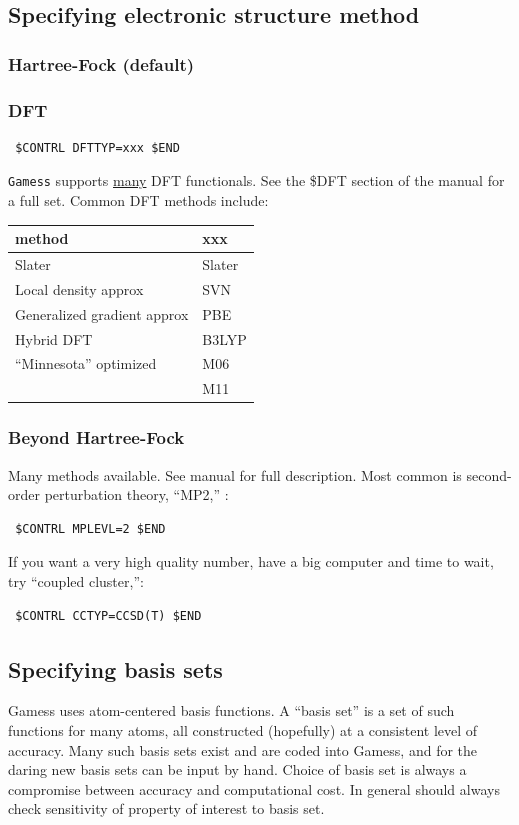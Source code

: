 \documentclass[11pt]{article}
\begin{document}
\subsection{Specifying electronic structure method}
\label{sec:org50de60d}
\subsubsection{Hartree-Fock (default)}
\label{sec:org33e8382}
\subsubsection{DFT}
\label{sec:org130944c}
\begin{verbatim}
 $CONTRL DFTTYP=xxx $END
\end{verbatim}
\texttt{Gamess} supports \uline{many} DFT functionals.  See the \$DFT section of the manual for a full set.  Common DFT methods include:
\begin{center}
\begin{tabular}{ll}
\hline
method & xxx\\
\hline
Slater & Slater\\
Local density approx & SVN\\
Generalized gradient approx & PBE\\
Hybrid DFT & B3LYP\\
``Minnesota'' optimized & M06\\
 & M11\\
\hline
\end{tabular}
\end{center}
\subsubsection{Beyond Hartree-Fock}
\label{sec:org5eff1be}
Many methods available.  See manual for full description.  Most common is second-order perturbation theory, ``MP2,'' :
\begin{verbatim}
 $CONTRL MPLEVL=2 $END
\end{verbatim}

If you want a very high quality number, have a big computer and time to wait, try ``coupled cluster,'':
\begin{verbatim}
 $CONTRL CCTYP=CCSD(T) $END
\end{verbatim}

\subsection{Specifying basis sets}
\label{sec:orga5d58f6}
Gamess uses atom-centered basis functions.  A ``basis set'' is a set of such functions for many atoms, all constructed (hopefully) at a consistent level of accuracy. Many such basis sets exist and are coded into Gamess, and for the daring new basis sets can be input by hand.  Choice of basis set is always a compromise between accuracy and computational cost.  In general should always check sensitivity of property of interest to basis set.
\end{document}
